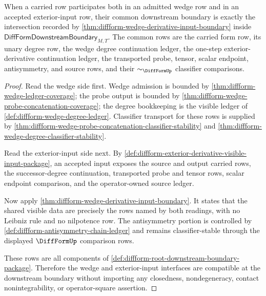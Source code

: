 \begin{theorem}
\label{thm:diffform-wedge-derivative-boundary-compatibility}
When a carried row participates both in an admitted wedge row and in an
accepted exterior-input row, their common downstream boundary is exactly the
intersection recorded by
\autoref{thm:diffform-wedge-derivative-input-boundary} inside
$\mathsf{DiffFormDownstreamBoundary}_{M,T}$. The common rows are the carried
form row, its unary degree row, the wedge degree continuation ledger, the
one-step exterior-derivative continuation ledger, the transported probe,
tensor, scalar endpoint, antisymmetry, and source rows, and their
$\sim_{\DiffFormUp}$ classifier comparisons.
\end{theorem}
\begin{proof}
Read the wedge side first. Wedge admission is bounded by
\autoref{thm:diffform-wedge-ledger-coverage}; the probe output is bounded by
\autoref{thm:diffform-wedge-probe-concatenation-coverage}; the degree
bookkeeping is the visible ledger of
\autoref{def:diffform-wedge-degree-ledger}. Classifier transport for these
rows is supplied by
\autoref{thm:diffform-wedge-probe-concatenation-classifier-stability} and
\autoref{thm:diffform-wedge-degree-classifier-stability}.

Read the exterior-input side next. By
\autoref{def:diffform-exterior-derivative-visible-input-package}, an accepted
input exposes the source and output carried rows, the successor-degree
continuation, transported probe and tensor rows, scalar endpoint comparison,
and the operator-owned source ledger.

Now apply \autoref{thm:diffform-wedge-derivative-input-boundary}. It states
that the shared visible data are precisely the rows named by both readings,
with no Leibniz rule and no nilpotence row. The antisymmetry portion is
controlled by \autoref{def:diffform-antisymmetry-chain-ledger} and remains
classifier-stable through the displayed $\DiffFormUp$ comparison rows.

These rows are all components of
\autoref{def:diffform-root-downstream-boundary-package}. Therefore the wedge
and exterior-input interfaces are compatible at the downstream boundary
without importing any closedness, nondegeneracy, contact nonintegrability, or
operator-square assertion.
\end{proof}

